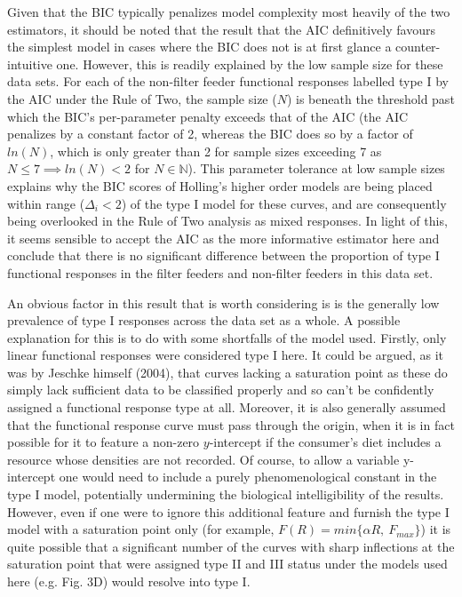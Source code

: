 \documentclass[11pt]{article}
\begin{document}
    Given that the BIC typically penalizes model complexity most heavily of the two estimators, it should be noted that the result that the AIC definitively favours the simplest model in cases where the BIC does not is at first glance a counter-intuitive one. However, this is readily explained by the low sample size for these data sets. For each of the non-filter feeder functional responses labelled type I by the AIC under the Rule of Two, the sample size ($N$) is beneath the threshold past which the BIC's per-parameter penalty exceeds that of the AIC (the AIC penalizes by a constant factor of 2, whereas the BIC does so by a factor of $ln(N)$, which is only greater than 2 for sample sizes exceeding 7 as $N \leq 7\implies ln(N)<2$ for $N\in\mathbb{N}$). This parameter tolerance at low sample sizes explains why the BIC scores of Holling's higher order models are being placed within range ($\Delta_i<2$) of the type I model for these curves, and are consequently being overlooked in the Rule of Two analysis as mixed responses. In light of this, it seems sensible to accept the AIC as the more informative estimator here and conclude that there is no significant difference between the proportion of type I functional responses in the filter feeders and non-filter feeders in this data set.
    
    An obvious factor in this result that is worth considering is is the generally low prevalence of type I responses across the data set as a whole. A possible explanation for this is to do with some shortfalls of the model used. Firstly, only linear functional responses were considered type I here. It could be argued, as it was by Jeschke himself (2004), that curves lacking a saturation point as these do simply lack sufficient data to be classified properly and so can't be confidently assigned a functional response type at all. 
    Moreover, it is also generally assumed that the functional response curve must pass through the origin, when it is in fact possible for it to feature a non-zero $y$-intercept if the consumer's diet includes a resource whose densities are not recorded. Of course, to allow a variable y-intercept one would need to include a purely phenomenological constant in the type I model, potentially undermining the biological intelligibility of the results. However, even if one were to ignore this additional feature and furnish the type I model with a saturation point only (for example, $F(R)=min\{\alpha R,\:F_{max}\}$) it is quite possible that a significant number of the curves with sharp inflections at the saturation point that were assigned type II and III status under the models used here (e.g. Fig. 3D) would resolve into type I.
    
\end{document}
